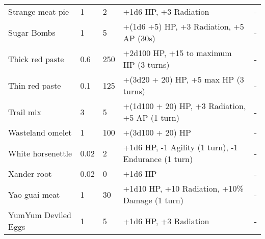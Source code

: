 \documentclass{report}
\begin{document}
\begin{table}[H]
\begin{table}[H]
\begin{table}[H]
\begin{table}[H]
\begin{table}[H]
\begin{table}[H]
\begin{table}[H]
\begin{table}[H]
\begin{table}[H]
\begin{table}[H]
\begin{table}[H]
\begin{table}[H]
\begin{table}[H]
\begin{table}[H]
\begin{table}[H]
\begin{tabular}{p{30mm}p{30mm}p{30mm}p{30mm}p{30mm}}
Strange meat pie  & 1 & 2 & +1d6 HP, +3 Radiation  & -  \\
Sugar Bombs  & 1 & 5 & +(1d6 +5) HP, +3 Radiation, +5 AP (30s)  & -  \\
Thick red paste  & 0.6  & 250 & +2d100 HP, +15 to maximum HP (3 turns)  & -  \\
Thin red paste  & 0.1  & 125 & +(3d20 + 20) HP, +5 max HP (3 turns)  & -  \\
Trail mix  & 3 & 5 & +(1d100 + 20) HP, +3 Radiation, +5 AP (1 turn)  & -  \\
Wasteland omelet  & 1 & 100 & +(3d100 + 20) HP  & -  \\
White horsenettle  & 0.02  & 2 & +1d6 HP, -1 Agility (1 turn), -1 Endurance (1 turn)  & -  \\
Xander root  & 0.02  & 0 & +1d6 HP  & -  \\
Yao guai meat  & 1 & 30 & +1d10 HP, +10 Radiation, +10\% Damage (1 turn)  & -  \\
YumYum Deviled Eggs  & 1 & 5 & +1d6 HP, +3 Radiation  & -  \\
  \end{tabular}

\end{table}
\end{table}
\end{table}
\end{table}
\end{table}
\end{table}
\end{table}
\end{table}
\end{table}
\end{table}
\end{table}
\end{table}
\end{table}
\end{table}
\end{table}
\end{document}
